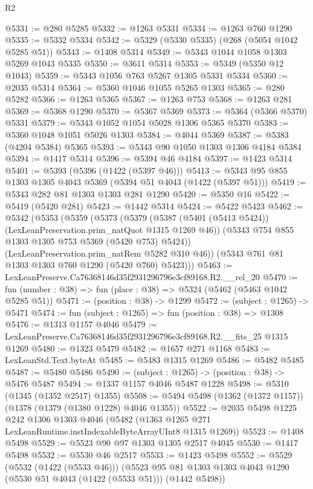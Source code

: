 \begin{lexlean}{R2}
\begin{coremodule}
@5331 := @280 @5285
@5332 := @1263 @5331
@5334 := @1263 @760 @1290
@5335 := @5332 @5334
@5342 := @5329 (@5330 @5335) (@268 (@5054 @1042 @5285 @51))
@5343 := @1408 @5314
@5349 := @5343 @1044 @1058 @1303 @5269 @1043 @5335
@5350 := @3611 @5314
@5353 := @5349 (@5350 @12 @1043)
@5359 := @5343 @1056 @763 @5267 @1305 @5331 @5334
@5360 := @2035 @5314
@5364 := @5360 @1046 @1055 @5265 @1303
@5365 := @280 @5282
@5366 := @1263 @5365
@5367 := @1263 @753
@5368 := @1263 @281
@5369 := @5368 @1290
@5370 := @5367 @5369
@5373 := @5364 (@5366 @5370) @5331
@5379 := @5343 @1052 @1054 @5028 @1306 @5365 @5370
@5383 := @5360 @1048 @1051 @5026 @1303
@5384 := @4044 @5369
@5387 := @5383 (@4204 @5384) @5365
@5393 := @5343 @90 @1050 @1303 @1306 @4184 @5384
@5394 := @1417 @5314
@5396 := @5394 @46 @4184
@5397 := @1423 @5314
@5401 := @5393 (@5396 (@1422 (@5397 @46)))
@5413 := @5343 @95 @855 @1303 @1305 @4043 @5369 (@5394 @51 @4043 (@1422 (@5397 @51)))
@5419 := @5343 @282 @81 @1303 @1303 @281 @1290
@5420 := @5350 @16
@5422 := @5419 (@5420 @281)
@5423 := @1442 @5314
@5424 := @5422 @5423
@5462 := @5342
    (@5353
      (@5359
        (@5373
          (@5379
            (@5387 (@5401 (@5413 @5424)) (LexLeanPreservation.prim_natQuot @1315 @1269 @46))
            (@5343 @754 @855 @1303 @1305 @753 @5369 (@5420 @753) @5424))
          (LexLeanPreservation.prim_natRem @5282 @310 @46))
        (@5343 @761 @81 @1303 @1303 @760 @1290 (@5420 @760) @5423)))
@5463 := LexLeanPreserve.Ca76368146d35f2931296796e3cf89168.R2.__rel_20
@5470 := fun (number : @38) => fun (place : @38) => @5324 (@5462 (@5463 @1042 @5285 @51))
@5471 := (position : @38) -> @1299
@5472 := (subject : @1265) -> @5471
@5474 := fun (subject : @1265) => fun (position : @38) => @1308
@5476 := @1313 @1157 @4046
@5479 := LexLeanPreserve.Ca76368146d35f2931296796e3cf89168.R2.__fits_25 @1315 @1269
@5480 := @1323 @5479
@5482 := @1657 @271 @1168
@5483 := LexLeanStd.Text.byteAt
@5485 := @5483 @1315 @1269
@5486 := @5482 @5485
@5487 := @5480 @5486
@5490 := (subject : @1265) -> (position : @38) -> @5476 @5487
@5494 := @1337 @1157 @4046 @5487 @1228
@5498 := @5310 (@1345 (@1352 @2517) @1355)
@5508 := @5494 @5498 (@1362 (@1372 @1157)) (@1378 (@1379 (@1380 @1228) @4046 @1355))
@5522 := @2035
    @5498
    @1225
    @242
    @1306
    @1303
    @4046
    (@5482 (@1363 @1265 @271 LexLeanRuntime.instIndexableByteArrayUInt8 @1315 @1269))
@5523 := @1408 @5498
@5529 := @5523 @90 @97 @1303 @1305 @2517 @4045
@5530 := @1417 @5498
@5532 := @5530 @46 @2517
@5533 := @1423 @5498
@5552 := @5529
    (@5532 (@1422 (@5533 @46)))
    (@5523 @95 @81 @1303 @1303 @4043 @1290 (@5530 @51 @4043 (@1422 (@5533 @51))) (@1442 @5498))

\end{coremodule}
\end{lexlean}
